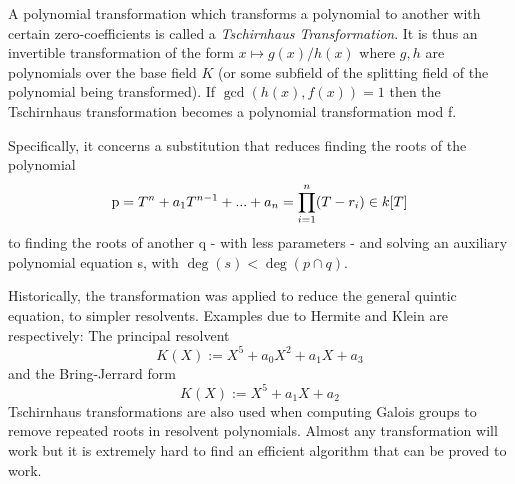 \documentclass[12pt]{article}
\begin{document}
A polynomial transformation which transforms a polynomial to another with certain zero-coefficients is called a
\emph{Tschirnhaus Transformation}. It is thus an invertible transformation of the form   $x \mapsto g(x)/h(x)$ where $g,h$ are polynomials over the base field $K$ (or some subfield of the splitting field of the polynomial being transformed). If $\gcd(h(x),f(x)) = 1$ then the Tschirnhaus transformation becomes a polynomial transformation mod f.

Specifically, it concerns a substitution that reduces finding the roots of the polynomial
$$
\textmd{p} = T^n + a_1T^{n-1} + ... + a_n = \prod_{i=1}^n
(T-r_i)\in k[T]
$$
to finding the roots of another \textmd{q} - with less parameters
- and solving an auxiliary polynomial equation \textmd{s}, with
$\deg(s)<\deg(p \cap q).$

Historically, the transformation was applied to reduce the general quintic equation, to simpler resolvents. Examples due to Hermite and Klein are
respectively: The principal resolvent
$$
K(X):=X^5+a_0X^2+a_1X+a_3
$$
and the Bring-Jerrard form
$$
K(X):=X^5+a_1X+a_2
$$
Tschirnhaus transformations are also used when computing Galois
groups to remove repeated roots in resolvent polynomials. Almost any transformation will work but it is
extremely hard to find an efficient algorithm that can be proved
to work.
\end{document}
